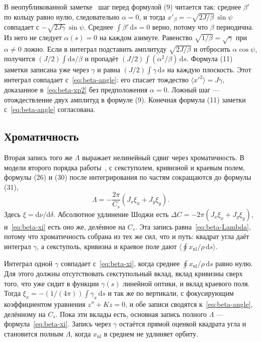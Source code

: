 В неопубликованной заметке~\cite{SenichevNote} шаг перед формулой (9) читается так: среднее $\beta'$ по кольцу равно нулю, следовательно $\alpha=0$, и тогда $x'_\beta=-\sqrt{2J/\beta}\,\sin\psi$ совпадает с $-\sqrt{2J\gamma}\,\sin\psi$. Среднее $\int\beta'\,\mathrm{d}s=0$ верно, потому что $\beta$ периодична. Из него не следует $\alpha(s)=0$ на каждом азимуте. Равенство $\sqrt{1/\beta}=\sqrt{\gamma}$ при $\alpha\neq 0$ ложно. Если в интеграл подставить амплитуду $\sqrt{2J/\beta}$ и отбросить $\alpha\cos\psi$, получится $(J/2)\int\mathrm{d}s/\beta$ и пропадёт $(J/2)\int(\alpha^2/\beta)\,\mathrm{d}s$. Формула (11) заметки записана уже через $\gamma$ и равна $(J/2)\int\gamma\,\mathrm{d}s$ на каждую плоскость. Этот интеграл совпадает с~\eqref{eq:beta-angle}: его спасает тождество $\langle x'^2\rangle=J\gamma$, доказанное в~\eqref{eq:beta-xp2} без предположения $\alpha=0$. Ложный шаг --- отождествление двух амплитуд в формуле (9). Конечная формула (11) заметки с~\eqref{eq:beta-angle} согласована.

\subsection{Хроматичность}
\label{sec:ch2-xi}

Вторая запись того же $\Lambda$ выражает нелинейный сдвиг через хроматичность. В модели второго порядка работы~\cite{Shoji2005}, с секступолем, кривизной и краевым полем, формулы (26) и (30) после интегрирования по частям сокращаются до формулы (31),
\begin{equation}
\label{eq:beta-xi}
\Lambda
=-\frac{2\pi}{C_s}(J_x\xi_x+J_y\xi_y).
\end{equation}
Здесь $\xi=\mathrm{d}\nu/\mathrm{d}\delta$. Абсолютное удлинение Шоджи есть $\Delta C=-2\pi(J_x\xi_x+J_y\xi_y)$, и~\eqref{eq:beta-xi} есть оно же, делённое на $C_s$. Эта запись равна~\eqref{eq:beta-Lambda}, потому что хроматичность собрана из тех же сил, что и путь: квадрат угла даёт интеграл $\gamma$, а секступоль, кривизна и краевое поле дают $\langle\oint x_{\mathrm{nl}}/\rho\,\mathrm{d}s\rangle$.

Интеграл одной $\gamma$ совпадает с~\eqref{eq:beta-xi}, когда среднее $\oint x_{\mathrm{nl}}/\rho\,\mathrm{d}s$ равно нулю. Для этого должны отсутствовать секступольный вклад, вклад кривизны сверх того, что уже сидит в функции $\gamma(s)$ линейной оптики, и вклад краевого поля. Тогда $\xi_x=-(1/(4\pi))\int\gamma_x\,\mathrm{d}s$ и так же по вертикали, с фокусирующим коэффициентом уравнения $z''+Kz=0$, и обе записи сводятся к~\eqref{eq:beta-angle}, делённому на $C_s$. Пока эти вклады есть, основная запись полного $\Lambda$ --- формула~\eqref{eq:beta-xi}. Запись через $\gamma$ остаётся прямой оценкой квадрата угла и становится полным $\Lambda$, когда $x_{\mathrm{nl}}$ в среднем не удлиняет орбиту.

